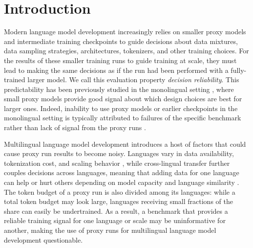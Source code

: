 \section{Introduction}
\label{sec:introduction}

Modern language model development increasingly relies on smaller proxy models and intermediate training checkpoints to guide decisions about data mixtures, data sampling strategies, architectures, tokenizers, and other training choices.
For the results of these smaller training runs to guide training at scale, they must lead to making the same decisions as if the run had been performed with a fully-trained larger model.
We call this evaluation property \emph{decision reliability}.
This predictability has been previously studied in the monolingual setting \citep{magnusson_datadecide_2025}, where small proxy models provide good signal about which design choices are best for larger ones. Indeed, inability to use proxy models or earlier checkpoints in the monolingual setting  is typically attributed to failures of the specific benchmark rather than lack of signal from the proxy runs
\citep{heineman_signal_2025}.

Multilingual language model development introduces a host of factors that could cause proxy run results to become noisy. %
Languages vary in data availability, tokenization cost, and scaling behavior \citep{petrov_language_2023, ahia_all_2023,mueninghof-data-constrained}, while cross-lingual transfer further couples decisions across languages, meaning that adding data for one language can help or hurt others depending on model capacity and language similarity \citep{chang_when_2023, longpre_atlas_2026}. 
The token budget of a proxy run is also divided among its languages: while a total token budget may look large, languages receiving small fractions of the share can easily be undertrained. 
As a result, a benchmark that provides a reliable training signal for one language or scale may be uninformative for another, making the use of proxy runs for multilingual language model development questionable.%

